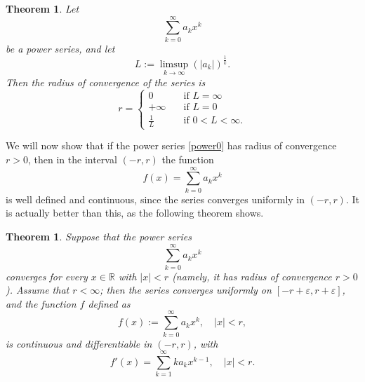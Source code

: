 \documentclass[a4paper,reqno]{amsart}
\numberwithin{equation}{section}
\newtheorem{theorem}[definition]{Theorem}
\def\R{\mathbb{R}}
\begin{document}
\begin{theorem}
Let
$$
\sum_{k=0}^\infty a_k x^k
$$
be a power series, and let 
$$
L:= \limsup_{k\to \infty} (|a_k|)^{\frac1k}.
$$
Then the radius of convergence of the series is 
$$
r = 
\begin{cases}
0 \quad &\textrm{if } L=\infty\\
+\infty \quad &\textrm{if } L=0\\
\frac1L \quad &\textrm{if } 0<L<\infty.
\end{cases}
$$
\end{theorem}



We will now show that if the power series \eqref{power0} has radius of convergence $r>0$, then in the interval $(-r,r)$ the function 
$$
f(x) = \sum_{k=0}^\infty a_k x^k
$$
is well defined and continuous, since the series converges uniformly in $(-r,r)$. It is actually better than this, as the following theorem shows.




\begin{theorem}\label{power:deriv}
Suppose that the power series 
$$
\sum_{k=0}^\infty a_k x^k
$$
converges for every $x\in \R$ with $|x|< r$ (namely, it has radius of convergence $r>0$). Assume that $r<\infty$; then the series converges uniformly on $[-r+\varepsilon, r+\varepsilon]$, and the function $f$ defined as
$$
f(x):=\sum_{k=0}^\infty a_k x^k, \quad |x|<r,
$$
is continuous and differentiable in $(-r,r)$, with
$$
f'(x) = \sum_{k=1}^\infty k a_k x^{k-1}, \quad |x|<r.
$$
\end{theorem}
\end{document}
